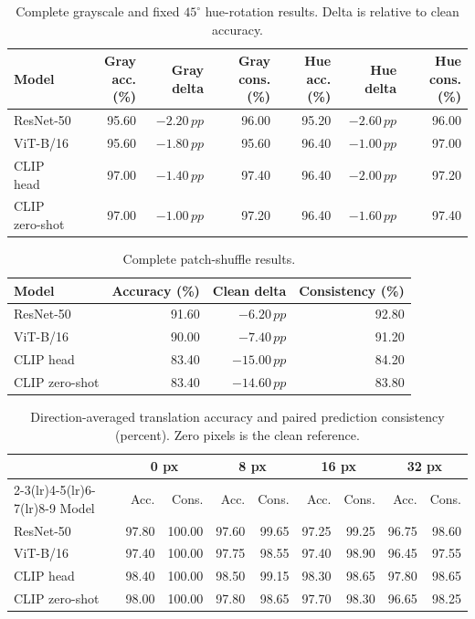 \documentclass{article}
\newcommand{\pp}{\,pp}
\begin{document}
\begin{table}[h]
  \caption{Complete grayscale and fixed $45^\circ$ hue-rotation results. Delta is relative to clean accuracy.}
  \centering
  \small
  \begin{tabular}{lrrrrrr}
    \toprule
    Model & Gray acc. (\%) & Gray delta & Gray cons. (\%) & Hue acc. (\%) & Hue delta & Hue cons. (\%) \\
    \midrule
    ResNet-50 & 95.60 & $-2.20\pp$ & 96.00 & 95.20 & $-2.60\pp$ & 96.00 \\
    ViT-B/16 & 95.60 & $-1.80\pp$ & 95.60 & 96.40 & $-1.00\pp$ & 97.00 \\
    CLIP head & 97.00 & $-1.40\pp$ & 97.40 & 96.40 & $-2.00\pp$ & 97.20 \\
    CLIP zero-shot & 97.00 & $-1.00\pp$ & 97.20 & 96.40 & $-1.60\pp$ & 97.40 \\
    \bottomrule
  \end{tabular}
\end{table}

\begin{table}[h]
  \caption{Complete patch-shuffle results.}
  \centering
  \small
  \begin{tabular}{lrrr}
    \toprule
    Model & Accuracy (\%) & Clean delta & Consistency (\%) \\
    \midrule
    ResNet-50 & 91.60 & $-6.20\pp$ & 92.80 \\
    ViT-B/16 & 90.00 & $-7.40\pp$ & 91.20 \\
    CLIP head & 83.40 & $-15.00\pp$ & 84.20 \\
    CLIP zero-shot & 83.40 & $-14.60\pp$ & 83.80 \\
    \bottomrule
  \end{tabular}
\end{table}

\begin{table}[h]
  \caption{Direction-averaged translation accuracy and paired prediction consistency (percent). Zero pixels is the clean reference.}
  \label{tab:t1-translation-full}
  \centering
  \small
  \begin{tabular}{lrrrrrrrr}
    \toprule
    & \multicolumn{2}{c}{0 px} & \multicolumn{2}{c}{8 px} & \multicolumn{2}{c}{16 px} & \multicolumn{2}{c}{32 px} \\
    \cmidrule(lr){2-3}\cmidrule(lr){4-5}\cmidrule(lr){6-7}\cmidrule(lr){8-9}
    Model & Acc. & Cons. & Acc. & Cons. & Acc. & Cons. & Acc. & Cons. \\
    \midrule
    ResNet-50 & 97.80 & 100.00 & 97.60 & 99.65 & 97.25 & 99.25 & 96.75 & 98.60 \\
    ViT-B/16 & 97.40 & 100.00 & 97.75 & 98.55 & 97.40 & 98.90 & 96.45 & 97.55 \\
    CLIP head & 98.40 & 100.00 & 98.50 & 99.15 & 98.30 & 98.65 & 97.80 & 98.65 \\
    CLIP zero-shot & 98.00 & 100.00 & 97.80 & 98.65 & 97.70 & 98.30 & 96.65 & 98.25 \\
    \bottomrule
  \end{tabular}
\end{table}
\end{document}
